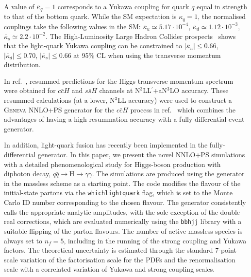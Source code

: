 \documentclass[11pt,a4paper]{article}
\begin{document}
A value of \( \bar\kappa_q = 1 \) corresponds to a Yukawa coupling for quark \( q \) equal in strength to that of the bottom quark. While the SM expectation is \( \kappa_q = 1 \), the normalised couplings take the following values in the SM:  
\( \bar \kappa_u \simeq 5.17 \cdot 10^{-4} \),  
\( \bar \kappa_d \simeq 1.12 \cdot 10^{-3} \),  
\( \bar \kappa_s \simeq 2.2 \cdot 10^{-2} \).
The High-Luminosity Large Hadron Collider prospects~\cite{deBlas:2019rxi} shows that the light-quark Yukawa coupling can be constrained to $|\bar \kappa_u|\leq 0.66$, $|\bar \kappa_d|\leq 0.70$, $|\bar \kappa_s|\leq 0.66$ at 95\% CL when using the transverse momentum distribution.

In ref.~\cite{Cal:2023mib}, resummed predictions for the Higgs transverse momentum spectrum were obtained for $c\bar{c}H$ and $s\bar{s}H$ channels at N$^3$LL$^{\prime}$+aN$^3$LO accuracy. These resummed calculations (at a lower, N$^3$LL accuracy) were used to construct a \textsc{Geneva} NNLO+PS generator for the $c\bar{c}H$ process in ref.~\cite{Gavardi:2025zpf} which combines the advantages of having a high resummation accuracy with a fully differential event generator.

In addition, light-quark fusion has recently been implemented in the fully-differential \minnlo{} generator. In this paper, we present the novel NNLO+PS simulations with a detailed phenomenological study for Higgs-boson production with diphoton decay, $q\bar q\rightarrow \text{H}\rightarrow \gamma\gamma$. The simulations are produced using the \minnlo{} \bbH{} generator in the massless scheme as a starting point. The code modifies the flavour of the initial-state partons via the \texttt{whichlightquark} flag, which is set to the Monte Carlo ID number corresponding to the chosen flavour. The generator consistently calls the appropriate analytic amplitudes, with the sole exception of the double real corrections, which are evaluated numerically using the \OpenLoops{} \texttt{bbhjj} library with a suitable flipping of the parton flavours. The number of active massless species is always set to \( n_f = 5 \), including in the running of the strong coupling and Yukawa factors. The theoretical uncertainty is estimated through the standard 7-point scale variation of the factorisation scale for the PDFs and the renormalisation scale with a correlated variation of Yukawa and strong coupling scales.
\end{document}
